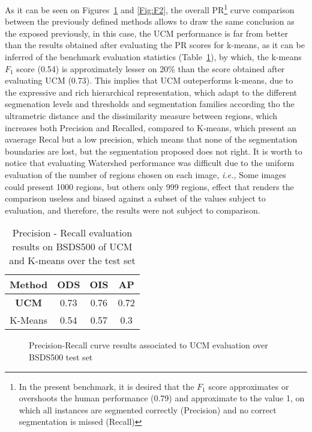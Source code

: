 \documentclass[10pt,twocolumn,letterpaper]{article}
\begin{document}
As it can be seen on Figures~\ref{Fig:F1} and \ref{Fig:F2}, the overall PR\footnote{In the present benchmark, it is desired that the $F_1$ score approximates or overshoots the human performance (0.79) and approximate to the value 1, on which all instances are segmented correctly (Precision) and no correct segmentation is missed (Recall)} curve comparison between the previously defined methods allows to draw the same conclusion as the exposed previously, in this case, the UCM performance is far from better than the results obtained after evaluating the PR scores for k-means, as it can be inferred of the benchmark evaluation statistics (Table~\ref{Tab:T1}), by which, the k-means $F_1$ score (0.54) is approximately lesser on 20\% than the score obtained after evaluating UCM (0.73). This implies that UCM outeperforms k-means, due to the expressive and rich hierarchical representation, which adapt to the different segmenation levels and thresholds and segmentation families according tho the ultrametric distance and the dissimilarity measure between regions, which increases both Precision and Recalled, compared to K-means, which present an avaerage Recal but a low precision, which means that none of the segmentation boundaries are lost, but the segmentation proposed does not right. It is worth to notice that evaluating Watershed performance was difficult due to the uniform evaluation of the number of regions chosen on each image, \textit{i.e.,} Some images could present 1000 regions, but others only 999 regions, effect that renders the comparison useless and biased against a subset of the values subject to evaluation, and therefore, the results were not subject to comparison.

\begin{table}[H]
	\centering
	\begin{tabular}{|c|c|c|c|}
		\hline
		Method & ODS & OIS & AP \\ \hline
		\textbf{UCM} & 0.73 & 0.76 & 0.72 \\ \hline
		K-Means & 0.54 & 0.57 & 0.3 \\ \hline
	\end{tabular}
\caption{Precision - Recall evaluation results on BSDS500 of UCM and K-means over the test set}
\label{Tab:T1}
\end{table}

\begin{figure}[H]
	\centering
	\caption{Precision-Recall curve results associated to UCM evaluation over BSDS500 test set}
	\label{Fig:F1}
\end{figure}
\end{document}
